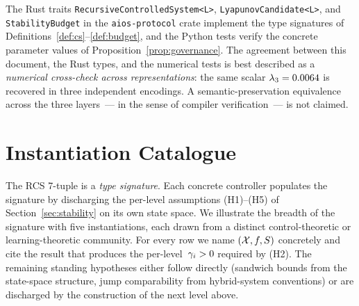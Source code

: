 \documentclass[11pt,a4paper]{article}
\begin{document}
\begin{remark}
\label{rem:witnesses}
The Rust traits \texttt{RecursiveControlledSystem\textless L\textgreater},
\texttt{LyapunovCandidate\textless L\textgreater}, and
\texttt{StabilityBudget} in the \texttt{aios-protocol} crate implement
the type signatures of Definitions~\ref{def:cs}--\ref{def:budget}, and
the Python tests verify the concrete parameter values of
Proposition~\ref{prop:governance}.  The agreement between this
document, the Rust types, and the numerical tests is best described as
a \emph{numerical cross-check across representations}: the same scalar
$\lambda_3 = 0.0064$ is recovered in three independent
encodings.  A semantic-preservation equivalence across the three
layers~--- in the sense of compiler verification~--- is not claimed.
\end{remark}


\section{Instantiation Catalogue}
\label{sec:instantiations}

The RCS 7-tuple is a \emph{type signature}.  Each concrete controller
populates the signature by discharging the per-level assumptions
(H1)--(H5) of Section~\ref{sec:stability} on its own state space.  We
illustrate the breadth of the signature with five instantiations, each
drawn from a distinct control-theoretic or learning-theoretic
community.  For every row we name $(\mathcal{X}, f, S)$ concretely and
cite the result that produces the per-level~$\gamma_i > 0$ required by
(H2).  The remaining standing hypotheses either follow directly
(sandwich bounds from the state-space structure, jump comparability
from hybrid-system conventions) or are discharged by the construction
of the next level above.
\end{document}
